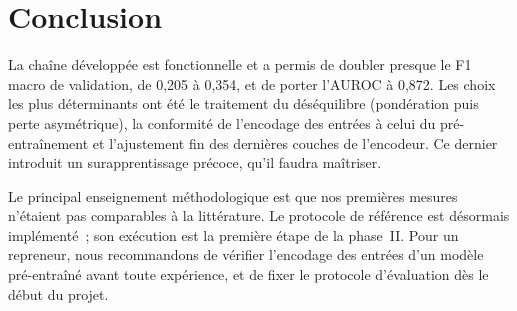 \section{Conclusion}
\label{sec:ConclusionExperimentations}

La chaîne développée est fonctionnelle et a permis de doubler presque le F1 macro de validation, de 0,205 à 0,354, et de porter l'AUROC à 0,872.
Les choix les plus déterminants ont été le traitement du déséquilibre (pondération puis perte asymétrique), la conformité de l'encodage des entrées à celui du pré-entraînement et l'ajustement fin des dernières couches de l'encodeur.
Ce dernier introduit un surapprentissage précoce, qu'il faudra maîtriser.

Le principal enseignement méthodologique est que nos premières mesures n'étaient pas comparables à la littérature.
Le protocole de référence est désormais implémenté~; son exécution est la première étape de la phase~II.
Pour un repreneur, nous recommandons de vérifier l'encodage des entrées d'un modèle pré-entraîné avant toute expérience, et de fixer le protocole d'évaluation dès le début du projet.
